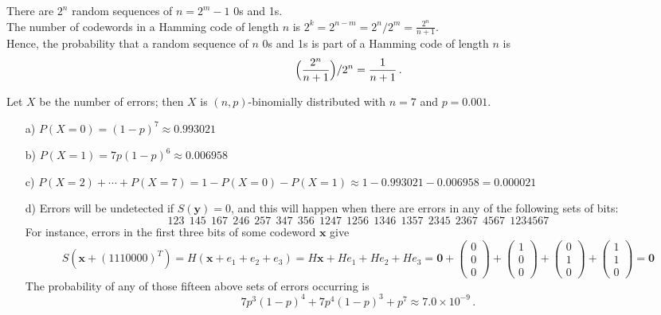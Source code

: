 \documentclass[11pt]{article}
\renewcommand{\vec}[1]{\mathbf{#1}}
\newcommand{\vc}[1]{\begin{pmatrix}#1\end{pmatrix}}
\begin{document}
\bigskip
{}
There are $2^n$ random sequences of $n = 2^m - 1$ 0s and 1s.\\
The number of codewords in a Hamming code of length $n$
is $2^k = 2^{n - m} = 2^n/2^m = \frac{2^n}{n+1}$.\\
Hence, the probability that a random sequence of $n$ 0s and 1s
is part of a Hamming code of length $n$ is\vspace*{-1mm}
\[
  \Bigl(\frac{2^n}{n+1}\Bigr)/2^n = \frac{1}{n+1}\,.
\]


{}
Let $X$ be the number of errors; then $X$ is $(n,p)$-binomially distributed with $n = 7$ and $p = 0.001$.
\begin{itemize}
  \item[{a)}] $P(X = 0) =     (1-p)^7 \approx 0.993021$
  \item[{b)}] $P(X = 1) = 7p  (1-p)^6 \approx 0.006958$
  \item[{c)}] $P(X = 2) + \cdots + P(X = 7) = 1 - P(X = 0) - P(X = 1) \approx 1 - 0.993021 - 0.006958 = 0.000021$
  \item[{d)}] Errors will be undetected if $S(\vec{y}) = 0$,
     and this will happen when there are errors in any of the following sets of bits:\vspace*{-1mm}
     \[
       123\:\:
       145\:\:
       167\:\:
       246\:\:
       257\:\:
       347\:\:
       356\:\:
       1247\:\:
       1256\:\:
       1346\:\:
       1357\:\:
       2345\:\:
       2367\:\:
       4567\:\:
       1234567
     \]
     For instance, errors in the first three bits of some codeword $\vec{x}$ give\vspace*{-3mm}
     \[
         S(\vec{x}+(1110000)^T)
       = H(\vec{x} + e_1 + e_2 + e_3)
       = H\vec{x} + He_1 + He_2 + He_3
       = \vec{0} + \vc{0\\0\\0} + \vc{1\\0\\0} + \vc{0\\1\\0} + \vc{1\\1\\0}
       = \vec{0}
     \]
     The probability of any of those fifteen above sets of errors occurring is
     \[
         7p^3(1-p)^4
       + 7p^4(1-p)^3
       +  p^7
       \approx 7.0\times 10^{-9}\,.
     \]
\end{itemize}
\end{document}
